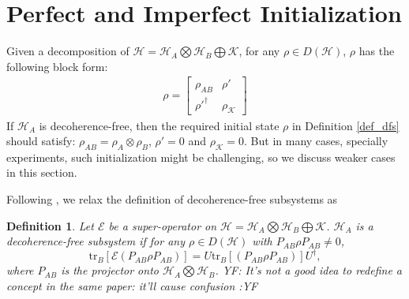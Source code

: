 \documentclass[journal]{IEEEtran}
\def\h{\ensuremath{\mathcal{H}}}
\def\k{\ensuremath{\mathcal{K}}}
\def\e{\ensuremath{\mathcal{E}}}
\def\k{\mathcal{K}}
\newtheorem{definition}{Definition}
\newcommand{\authorComment}[3]{\color{#1}#2: {#3} :#2\color{black}}
\newcommand{\yf}[1]{\authorComment{blue}{YF}{#1}}
\begin{document}
\section{Perfect and Imperfect Initialization}
 Given a decomposition of $\h=\h_A\bigotimes \h_B\bigoplus\k$, for any $\rho\in D(\h)$, $\rho$ has the following block form:
  \begin{eqnarray}
  \rho=\left[ \begin{matrix}
  \rho_{AB}&\rho'\\
  \rho'^\dagger&\rho_\k
  \end{matrix}\right]
\end{eqnarray}
If $\h_A$ is decoherence-free, then the required initial state $\rho$ in Definition \ref{def_dfs} should satisfy: $\rho_{AB}=\rho_A\otimes \rho_B$, $\rho'=0$ and $\rho_\k=0$. 
  But in many cases, specially experiments,  such initialization might be challenging, so we discuss weaker cases in this section.

 Following \cite{shabani2005theory}, we relax the definition of decoherence-free subsystems as
 \begin{definition}
   Let $\e$ be a super-operator on $\h=\h_A\bigotimes\h_B\bigoplus\k $.
   $\h_A$ is a decoherence-free subsystem if for any $\rho\in D(\h)$ with $P_{AB}\rho P_{AB}\not =0$, $$\textrm{tr}_{B}[\e(P_{AB}\rho P_{AB})]=U\textrm{tr}_{B}[(P_{AB}\rho P_{AB})]U^\dagger,$$
   where $P_{AB}$ is the projector onto $\h_A\bigotimes \h_B$. \yf{It's not a good idea to \emph{redefine} a concept in the same paper: it'll cause confusion}
 \end{definition}
\end{document}
